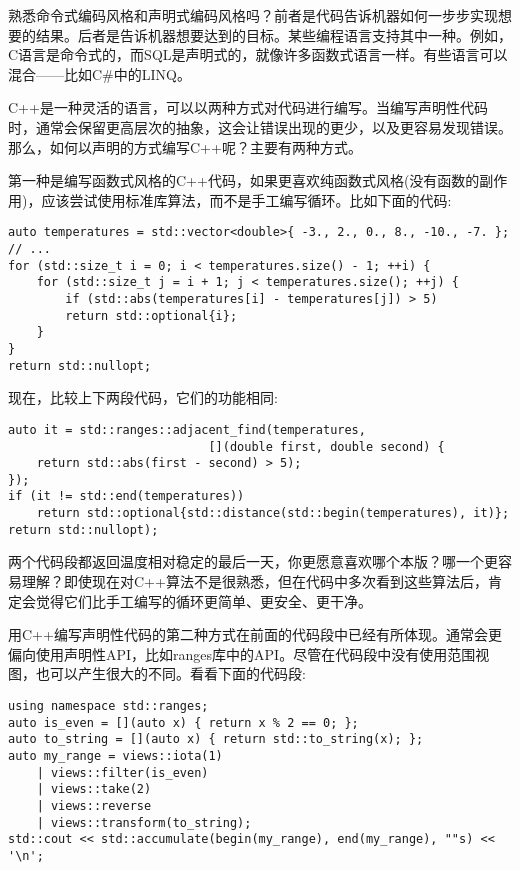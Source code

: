 
熟悉命令式编码风格和声明式编码风格吗？前者是代码告诉机器如何一步步实现想要的结果。后者是告诉机器想要达到的目标。某些编程语言支持其中一种。例如，C语言是命令式的，而SQL是声明式的，就像许多函数式语言一样。有些语言可以混合——比如C\#中的LINQ。

C++是一种灵活的语言，可以以两种方式对代码进行编写。当编写声明性代码时，通常会保留更高层次的抽象，这会让错误出现的更少，以及更容易发现错误。那么，如何以声明的方式编写C++呢？主要有两种方式。

第一种是编写函数式风格的C++代码，如果更喜欢纯函数式风格(没有函数的副作用)，应该尝试使用标准库算法，而不是手工编写循环。比如下面的代码:

\begin{lstlisting}[style=styleCXX]
auto temperatures = std::vector<double>{ -3., 2., 0., 8., -10., -7. };
// ...
for (std::size_t i = 0; i < temperatures.size() - 1; ++i) {
	for (std::size_t j = i + 1; j < temperatures.size(); ++j) {
		if (std::abs(temperatures[i] - temperatures[j]) > 5)
		return std::optional{i};
	}
}
return std::nullopt;
\end{lstlisting}

现在，比较上下两段代码，它们的功能相同:

\begin{lstlisting}[style=styleCXX]
auto it = std::ranges::adjacent_find(temperatures,
							[](double first, double second) {
	return std::abs(first - second) > 5);
});
if (it != std::end(temperatures))
	return std::optional{std::distance(std::begin(temperatures), it)};
return std::nullopt);
\end{lstlisting}

两个代码段都返回温度相对稳定的最后一天，你更愿意喜欢哪个本版？哪一个更容易理解？即使现在对C++算法不是很熟悉，但在代码中多次看到这些算法后，肯定会觉得它们比手工编写的循环更简单、更安全、更干净。

用C++编写声明性代码的第二种方式在前面的代码段中已经有所体现。通常会更偏向使用声明性API，比如ranges库中的API。尽管在代码段中没有使用范围视图，也可以产生很大的不同。看看下面的代码段:

\begin{lstlisting}[style=styleCXX]
using namespace std::ranges;
auto is_even = [](auto x) { return x % 2 == 0; };
auto to_string = [](auto x) { return std::to_string(x); };
auto my_range = views::iota(1)
	| views::filter(is_even)
	| views::take(2)
	| views::reverse
	| views::transform(to_string);
std::cout << std::accumulate(begin(my_range), end(my_range), ""s) << '\n';
\end{lstlisting}

